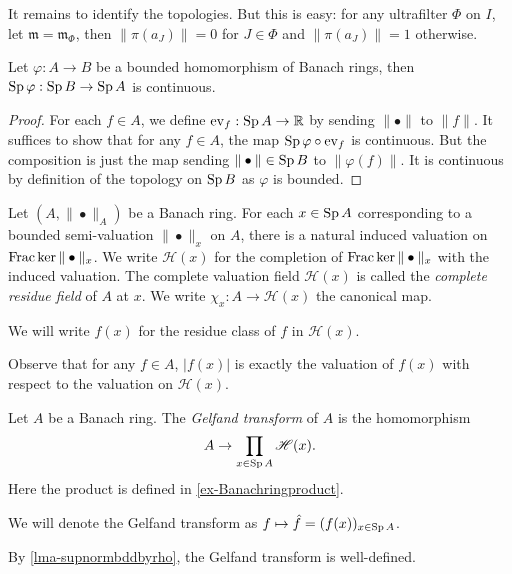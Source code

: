 \begin{example}
    It remains to identify the topologies. But this is easy: for any ultrafilter $\Phi$ on $I$, let $\mathfrak{m}=\mathfrak{m}_{\Phi}$, then $\|\pi(a_J)\|=0$ for $J\in \Phi$ and $\|\pi(a_J)\|=1$ otherwise. 
\end{example}

\begin{proposition}\label{prop-Spcontinuous}
    Let $\varphi:A\rightarrow B$ be a bounded homomorphism of Banach rings, then $\operatorname{Sp} \varphi:\operatorname{Sp} B\rightarrow \operatorname{Sp} A$ is continuous.
\end{proposition}
\begin{proof}
    For each $f\in A$, we define $\mathrm{ev}_f:\operatorname{Sp} A\rightarrow \mathbb{R}$ by sending $\|\bullet\|$ to $\|f\|$.
    It suffices to show that for any $f\in A$, the map $\operatorname{Sp} \varphi\circ\mathrm{ev}_f$ is continuous. But the composition is just the map sending $\|\bullet\|\in \operatorname{Sp} B$ to $\|\varphi(f)\|$. It is continuous by definition of the topology on $\operatorname{Sp} B$ as $\varphi$ is bounded.
\end{proof}

\begin{definition}\label{def-residuefield}
    Let $(A,\|\bullet\|_A)$ be a Banach ring. For each $x\in \operatorname{Sp} A$ corresponding to a bounded semi-valuation $\|\bullet\|_x$ on $A$, there is a natural induced valuation on $\operatorname{Frac} \ker \|\bullet\|_x$. We write $\mathscr{H}(x)$ for the completion of $\operatorname{Frac} \ker \|\bullet\|_x$ with the induced valuation. The complete valuation field $\mathscr{H}(x)$ is called the \emph{complete residue field} of $A$ at $x$. We write $\chi_x:A\rightarrow \mathscr{H}(x)$ the canonical map.

    We will write $f(x)$ for the residue class of $f$ in $\mathscr{H}(x)$. 
\end{definition}
Observe that for any $f\in A$, $|f(x)|$ is exactly the valuation of $f(x)$ with respect to the valuation on $\mathscr{H}(x)$.



\begin{definition}
    Let $A$ be a Banach ring. 
    The \emph{Gelfand transform} of $A$ is the homomorphism
    \[
        A\rightarrow \prod_{x\in \operatorname{Sp} A} \mathscr{H}(x).  
    \]
    Here the product is defined in \cref{ex-Banachringproduct}.

    We will denote the Gelfand transform as $f\mapsto \hat{f}=(f(x))_{x\in \operatorname{Sp} A}$.
\end{definition}
By \cref{lma-supnormbddbyrho}, the Gelfand transform is well-defined.


